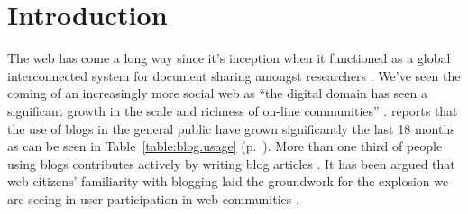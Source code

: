\chapter{Introduction}

%
%

The web has come a long way since it's inception when it functioned as a
global interconnected system for document sharing amongst researchers
\citep[p.~82]{bernerslee92}. We've
seen the coming of an increasingly more social web as
``the digital domain has seen a significant growth in the scale and richness
of on-line communities'' \citep[p.~44]{backstrom06}.
\citet[ch.~1, p.~2]{rosa07} reports that the
use of blogs in the general public%
have grown significantly the last 18 months as can be seen in
Table~\ref{table:blog.usage}
(p.~\pageref{table:blog.usage}).
More than one third of people using blogs contributes actively
by writing blog articles \citep[ch.~1, p.~6]{rosa07}.
It has been argued that web citizens'
familiarity with blogging laid the groundwork for the explosion we are seeing
in user participation in web communities \citep{weiss05,beer07}.


